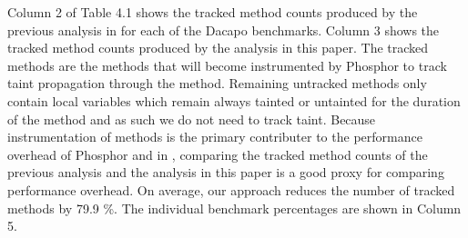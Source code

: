 \begin{center}
\end{center}

Column 2 of Table 4.1 shows the tracked method counts produced by the previous analysis in \cite{manoj_project} for each of the Dacapo benchmarks. Column 3 shows the tracked method counts produced by the analysis in this paper. The tracked methods are the methods that will become instrumented by Phosphor to track taint propagation through the method. Remaining untracked methods only contain local variables which remain always tainted or untainted for the duration of the method and as such we do not need to track taint. Because instrumentation of methods is the primary contributer to the performance overhead of Phosphor and in \cite{manoj_phosphor}, comparing the tracked method counts of the previous analysis and the analysis in this paper is a good proxy for comparing performance overhead. On average, our approach reduces the number of tracked methods by 79.9 \%. The individual benchmark percentages are shown in Column 5. 

